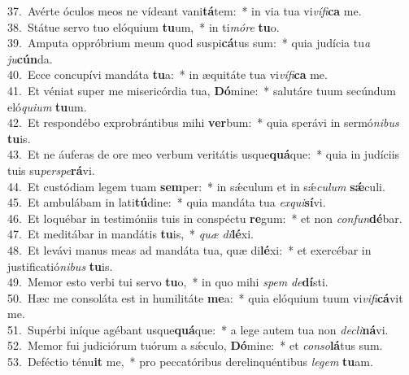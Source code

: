 {37.~}Avérte óculos meos ne vídeant vani\textbf{tá}tem:~* in via tua vi\textit{ví}\textit{fi}\textbf{ca} me.\\
{38.~}Státue servo tuo elóquium \textbf{tu}um,~* in ti\textit{mó}\textit{re} \textbf{tu}o.\\
{39.~}Amputa oppróbrium meum quod suspi\textbf{cá}tus sum:~* quia judícia tu\textit{a} \textit{ju}\textbf{cún}da.\\
{40.~}Ecce concupívi mandáta \textbf{tu}a:~* in æquitáte tua vi\textit{ví}\textit{fi}\textbf{ca} me.\\
{41.~}Et véniat super me misericórdia tua, \textbf{Dó}mine:~* salutáre tuum secúndum eló\textit{qui}\textit{um} \textbf{tu}um.\\
{42.~}Et respondébo exprobrántibus mihi \textbf{ver}bum:~* quia sperávi in sermó\textit{ni}\textit{bus} \textbf{tu}is.\\
{43.~}Et ne áuferas de ore meo verbum veritátis usque\textbf{quá}que:~* quia in judíciis tuis su\textit{per}\textit{spe}\textbf{rá}vi.\\
{44.~}Et custódiam legem tuam \textbf{sem}per:~* in sǽculum et in sǽ\textit{cu}\textit{lum} \textbf{sǽ}culi.\\
{45.~}Et ambulábam in lati\textbf{tú}dine:~* quia mandáta tua \textit{ex}\textit{qui}\textbf{sí}vi.\\
{46.~}Et loquébar in testimóniis tuis in conspéctu \textbf{re}gum:~* et non \textit{con}\textit{fun}\textbf{dé}bar.\\
{47.~}Et meditábar in mandátis \textbf{tu}is,~* \textit{quæ} \textit{di}\textbf{lé}xi.\\
{48.~}Et levávi manus meas ad mandáta tua, quæ di\textbf{lé}xi:~* et exercébar in justificatió\textit{ni}\textit{bus} \textbf{tu}is.\\
{49.~}Memor esto verbi tui servo \textbf{tu}o,~* in quo mihi \textit{spem} \textit{de}\textbf{dí}sti.\\
{50.~}Hæc me consoláta est in humilitáte \textbf{me}a:~* quia elóquium tuum vi\textit{vi}\textit{fi}\textbf{cá}vit me.\\
{51.~}Supérbi iníque agébant usque\textbf{quá}que:~* a lege autem tua non \textit{de}\textit{cli}\textbf{ná}vi.\\
{52.~}Memor fui judiciórum tuórum a sǽculo, \textbf{Dó}mine:~* et \textit{con}\textit{so}\textbf{lá}tus sum.\\
{53.~}Deféctio ténu\textbf{it} me,~* pro peccatóribus derelinquéntibus \textit{le}\textit{gem} \textbf{tu}am.\\
